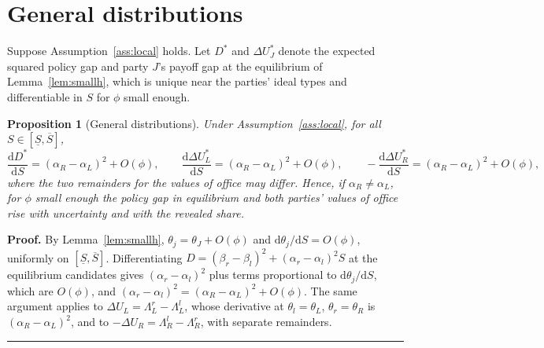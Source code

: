 \documentclass[12pt,letterpaper]{article}
\newtheorem{proposition}{Proposition}
\newenvironment{proof}[1][Proof]{\noindent\textbf{#1.} }{\ \rule{0.5em}{0.5em}}
\begin{document}
\section{General distributions}

Suppose Assumption~\ref{ass:local} holds. Let $D^*$ and $\Delta U_J^*$ denote the expected squared policy gap and party $J$'s payoff gap at the equilibrium of Lemma~\ref{lem:smallh}, which is unique near the parties' ideal types and differentiable in $S$ for $\phi$ small enough.

\begin{proposition}[General distributions]\label{prop:general}
Under Assumption~\ref{ass:local}, for all $S\in[\underline S,\overline S]$,
\begin{equation}\label{eq:general}
\frac{\mathrm{d}D^*}{\mathrm{d}S}=(\alpha_R-\alpha_L)^2+O(\phi),
\qquad
\frac{\mathrm{d}\Delta U_L^*}{\mathrm{d}S}=(\alpha_R-\alpha_L)^2+O(\phi),
\qquad
-\frac{\mathrm{d}\Delta U_R^*}{\mathrm{d}S}=(\alpha_R-\alpha_L)^2+O(\phi),
\end{equation}
where the two remainders for the values of office may differ. Hence, if $\alpha_R\ne\alpha_L$, for $\phi$ small enough the policy gap in equilibrium and both parties' values of office rise with uncertainty and with the revealed share.
\end{proposition}

\begin{proof}
By Lemma~\ref{lem:smallh}, $\theta_j=\theta_J+O(\phi)$ and $\mathrm{d}\theta_j/\mathrm{d}S=O(\phi)$, uniformly on $[\underline S,\overline S]$. Differentiating $D=(\beta_r-\beta_l)^2+(\alpha_r-\alpha_l)^2S$ at the equilibrium candidates gives $(\alpha_r-\alpha_l)^2$ plus terms proportional to $\mathrm{d}\theta_j/\mathrm{d}S$, which are $O(\phi)$, and $(\alpha_r-\alpha_l)^2=(\alpha_R-\alpha_L)^2+O(\phi)$. The same argument applies to $\Delta U_L=\Lambda_L^r-\Lambda_L^l$, whose derivative at $\theta_l=\theta_L$, $\theta_r=\theta_R$ is $(\alpha_R-\alpha_L)^2$, and to $-\Delta U_R=\Lambda_R^l-\Lambda_R^r$, with separate remainders.
\end{proof}
\end{document}
